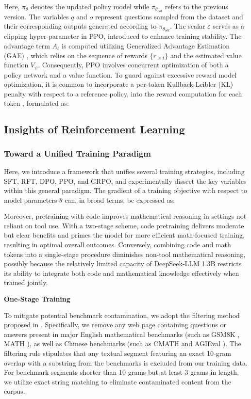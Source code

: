 \begin{itemize}[topsep=0pt]
\begin{itemize}[topsep=0pt]
Here, $\pi_{\theta}$ denotes the updated policy model while $\pi_{\theta_{old}}$ refers to the previous version. The variables $q$ and $o$ represent questions sampled from the dataset and their corresponding outputs generated according to $\pi_{\theta_{old}}$. The scalar $\varepsilon$ serves as a clipping hyper-parameter in PPO, introduced to enhance training stability. The advantage term $A_t$ is computed utilizing Generalized Advantage Estimation (GAE) \citep{gae}, which relies on the sequence of rewards $\{r_{\ge t}\}$ and the estimated value function $V_{\psi}$. Consequently, PPO involves concurrent optimization of both a policy network and a value function. To guard against excessive reward model optimization, it is common to incorporate a per-token Kullback-Leibler (KL) penalty with respect to a reference policy, into the reward computation for each token \citep{ouyang2022training}, formulated as:

\subsection{Insights of Reinforcement Learning}
\subsubsection{Toward a Unified Training Paradigm} Here, we introduce a framework that unifies several training strategies, including SFT, RFT, DPO, PPO, and GRPO, and experimentally dissect the key variables within this general paradigm. The gradient of a training objective with respect to model parameters $\theta$ can, in broad terms, be expressed as:

Moreover, pretraining with code improves mathematical reasoning in settings not reliant on tool use. With a two-stage scheme, code pretraining delivers moderate but clear benefits and primes the model for more efficient math-focused training, resulting in optimal overall outcomes. Conversely, combining code and math tokens into a single-stage procedure diminishes non-tool mathematical reasoning, possibly because the relatively limited capacity of DeepSeek-LLM 1.3B restricts its ability to integrate both code and mathematical knowledge effectively when trained jointly.

\textbf{One-Stage Training}

To mitigate potential benchmark contamination, we adopt the filtering method proposed in \cite{deepseek-coder}. Specifically, we remove any web page containing questions or answers present in major English mathematical benchmarks (such as GSM8K \citep{gsm8k}, MATH \citep{MATH}), as well as Chinese benchmarks (such as CMATH \citep{wei2023cmath} and AGIEval \citep{agieval}). The filtering rule stipulates that any textual segment featuring an exact 10-gram overlap with a substring from the benchmarks is excluded from our training data. For benchmark segments shorter than 10 grams but at least 3 grams in length, we utilize exact string matching to eliminate contaminated content from the corpus.


\end{itemize}
\end{itemize}
